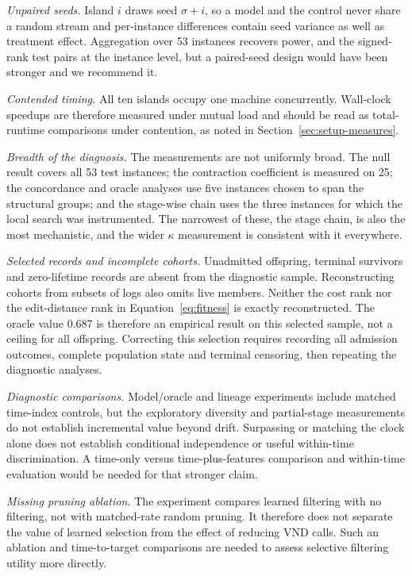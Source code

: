 \documentclass[a4paper,fleqn]{cas-dc}
\begin{document}
\emph{Unpaired seeds.} Island $i$ draws seed $\sigma + i$, so a model and the
control never share a random stream and per-instance differences contain seed
variance as well as treatment effect. Aggregation over 53 instances recovers
power, and the signed-rank test pairs at the instance level, but a paired-seed
design would have been stronger and we recommend it.

\emph{Contended timing.} All ten islands occupy one machine concurrently.
Wall-clock speedups are therefore measured under mutual load and should be read
as total-runtime comparisons under contention, as noted in
Section~\ref{sec:setup-measures}.

\emph{Breadth of the diagnosis.} The measurements are not uniformly broad. The
null result covers all 53 test instances; the contraction coefficient is measured
on 25; the concordance and oracle analyses use five instances chosen to span the
structural groups; and the stage-wise chain uses the three instances for which
the local search was instrumented. The narrowest of these, the stage chain, is
also the most mechanistic, and the wider $\kappa$ measurement is consistent with
it everywhere.

\emph{Selected records and incomplete cohorts.} Unadmitted offspring, terminal
survivors and zero-lifetime records are absent from the diagnostic sample.
Reconstructing cohorts from subsets of logs also omits live members. Neither
the cost rank nor the edit-distance rank in Equation~\eqref{eq:fitness} is
exactly reconstructed. The oracle value $0.687$ is therefore an empirical result
on this selected sample, not a ceiling for all offspring. Correcting this
selection requires recording all admission outcomes, complete population state
and terminal censoring, then repeating the diagnostic analyses.

\emph{Diagnostic comparisons.} Model/oracle and lineage experiments include
matched time-index controls, but the exploratory diversity and partial-stage
measurements do not establish incremental value beyond drift. Surpassing or
matching the clock alone does not establish conditional independence or useful
within-time discrimination. A time-only versus time-plus-features comparison
and within-time evaluation would be needed for that stronger claim.

\emph{Missing pruning ablation.} The experiment compares learned filtering with
no filtering, not with matched-rate random pruning. It therefore does not
separate the value of learned selection from the effect of reducing VND calls.
Such an ablation and time-to-target comparisons are needed to assess selective
filtering utility more directly.
\end{document}
